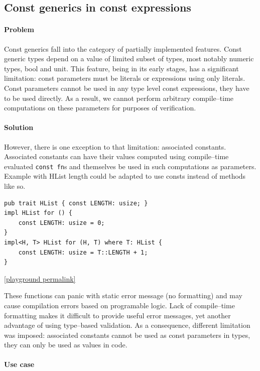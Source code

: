 \subsection{Const generics in const expressions}

\paragraph{Problem}

Const generics fall into the category of partially implemented features. Const generic types depend on a value of limited subset of types, most notably numeric types, bool and unit.
This feature, being in its early stages, has a significant limitation: const parameters must be literals or expressions using only literals. 
Const parameters cannot be used in any type level const expressions, they have to be used directly. 
As a result, we cannot perform arbitrary compile--time computations on these parameters for purposes of verification.

\paragraph{Solution}

However, there is one exception to that limitation: associated constants. Associated constants can have their values computed using compile--time evaluated \texttt{const fn}s and themselves be used in such computations as parameters.
Example with HList length could be adapted to use consts instead of methods like so.

\begin{lstlisting}
pub trait HList { const LENGTH: usize; }
impl HList for () {
    const LENGTH: usize = 0;
}
impl<H, T> HList for (H, T) where T: HList {
    const LENGTH: usize = T::LENGTH + 1;
}
\end{lstlisting}
\noindent \href{https://play.rust-lang.org/?version=stable&mode=debug&edition=2021&gist=05d326a2dc997f8005fb06711fe6fa3f}{[playground permalink]}

These functions can panic with static error message (no formatting) and may cause compilation errors based on programable logic.
Lack of compile--time formatting makes it difficult to provide useful error messages, yet another advantage of using type--based validation.
As a consequence, different limitation was imposed: associated constants cannot be used as const parameters in types, they can only be used as values in code.

\paragraph{Use case}

